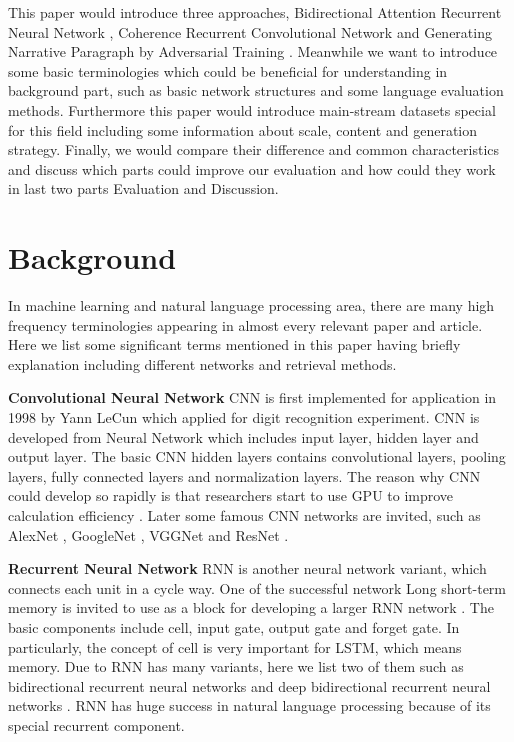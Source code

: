 \documentclass[11pt]{article}
\begin{document}
This paper would introduce three approaches, Bidirectional Attention Recurrent Neural Network \cite{liu2017let}, Coherence Recurrent Convolutional Network \cite{NIPS2015_5776} and Generating Narrative Paragraph by Adversarial Training \cite{show-reward-tell-automatic-generation-narrative-paragraph-photo-stream-adversarial-training}. Meanwhile we want to introduce some basic terminologies which could be beneficial for understanding in background part, such as basic network structures and some language evaluation methods. Furthermore this paper would introduce main-stream datasets special for this field including some information about scale, content and generation strategy. Finally, we would compare their difference and common characteristics and discuss which parts could improve our evaluation and how could they work in last two parts Evaluation and Discussion. 

\section{Background}
In machine learning and natural language processing area, there are many high frequency terminologies appearing in almost every relevant paper and article. Here we list some significant terms mentioned in this paper having briefly explanation including different networks and retrieval methods.

{\bf Convolutional Neural Network} CNN is first implemented for application in 1998 by Yann LeCun \cite{lecun1998gradient} which applied for digit recognition experiment. CNN is developed from Neural Network \cite{hornik1989multilayer} which includes input layer, hidden layer and output layer. The basic CNN hidden layers contains convolutional layers, pooling layers, fully connected layers and normalization layers. The reason why CNN could develop so rapidly is that researchers start to use GPU to improve calculation efficiency \cite{steinkraus2005using}. Later some famous CNN networks are invited, such as AlexNet \cite{NIPS2012_4824}, GoogleNet \cite{szegedy2015going}, VGGNet \cite{Simonyan14c} and ResNet \cite{he2016deep}.

{\bf Recurrent Neural Network} RNN is another neural network variant, which connects each unit in a cycle way. One of the successful network Long short-term memory is invited to use as a block for developing a larger RNN network \cite{hochreiter1997long}. The basic components include cell, input gate, output gate and forget gate. In particularly, the concept of cell is very important for LSTM, which means memory. Due to RNN has many variants, here we list two of them such as bidirectional recurrent neural networks \cite{schuster1997bidirectional} and deep bidirectional recurrent neural networks \cite{graves2013speech}. RNN has huge success in natural language processing because of its special recurrent component. 
\end{document}
